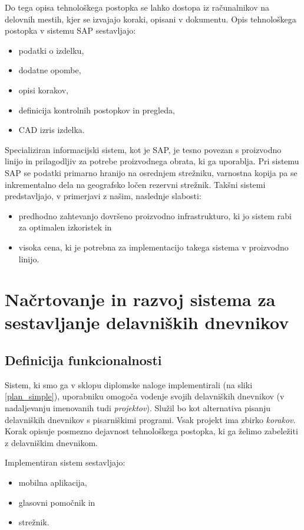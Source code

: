\documentclass[a4paper, 12pt]{book}
\begin{document}
Do tega opisa tehnološkega postopka se lahko dostopa iz računalnikov na delovnih mestih, kjer se izvajajo koraki, opisani v dokumentu.
Opis tehnološkega postopka v sistemu SAP sestavljajo:
\begin{itemize}
	\item podatki o izdelku,
	\item dodatne opombe,
	\item opisi korakov,
	\item definicija kontrolnih postopkov in pregleda, 
	\item CAD izris izdelka.
\end{itemize}

Specializiran informacijski sistem, kot je SAP, je tesno povezan s proizvodno linijo in prilagodljiv za potrebe proizvodnega obrata, ki ga uporablja.
Pri sistemu SAP se podatki primarno hranijo na osrednjem strežniku, varnostna kopija pa se inkrementalno dela na geografsko ločen rezervni strežnik.
Takšni sistemi predstavljajo, v primerjavi z našim, naslednje slabosti:
\begin{itemize}
	\item predhodno zahtevanjo dovršeno proizvodno infrastrukturo, ki jo sistem rabi za optimalen izkoristek in
	\item visoka cena, ki je potrebna za implementacijo takega sistema v proizvodno linijo.
\end{itemize}


\chapter{Načrtovanje in razvoj sistema za sestavljanje delavniških dnevnikov}

\section{Definicija funkcionalnosti}

Sistem, ki smo ga v sklopu diplomske naloge implementirali (na sliki \ref{plan_simple}), uporabniku omogoča vodenje svojih delavniških dnevnikov (v nadaljevanju imenovanih tudi \textit{projektov}).
Služil bo kot alternativa pisanju delavniških dnevnikov s pisarniškimi programi.
Vsak projekt ima zbirko \textit{korakov}.
Korak opisuje posmezno dejavnost tehnološkega postopka, ki ga želimo zabeležiti z delavniškim dnevnikom.

Implementiran sistem sestavljajo:
\begin{itemize}
	\item mobilna aplikacija,
	\item glasovni pomočnik in
	\item strežnik.
\end{itemize}
\end{document}
